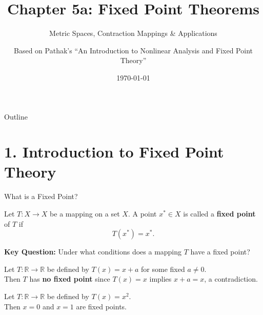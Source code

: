 \documentclass[aspectratio=169,10pt]{beamer}
\title[Chapter 5a: Fixed Point Theorems]{Chapter 5a: Fixed Point Theorems}
\subtitle{Metric Spaces, Contraction Mappings \& Applications}
\author{Based on Pathak's ``An Introduction to Nonlinear Analysis and Fixed Point Theory''}
\date{\today}
\institute{Nonlinear Analysis \& Fixed Point Theory}
\begin{document}
\begin{frame}
    \titlepage
\end{frame}

\begin{frame}{Outline}
    \tableofcontents
\end{frame}

\section{1. Introduction to Fixed Point Theory}

\begin{frame}{What is a Fixed Point?}
    \begin{definition}
        Let $T: X \to X$ be a mapping on a set $X$. A point $x^* \in X$ is called a \textbf{fixed point} of $T$ if
        \[
            T(x^*) = x^*.
        \]
    \end{definition}

    \vspace{0.5cm}
    \textbf{Key Question:} Under what conditions does a mapping $T$ have a fixed point?

    \vspace{0.5cm}
    \begin{example}
        Let $T: \mathbb{R} \to \mathbb{R}$ be defined by $T(x) = x + a$ for some fixed $a \neq 0$. \\
        Then $T$ has \textbf{no fixed point} since $T(x) = x$ implies $x + a = x$, a contradiction.
    \end{example}

    \vspace{0.3cm}
    \begin{example}
        Let $T: \mathbb{R} \to \mathbb{R}$ be defined by $T(x) = x^2$. \\
        Then $x = 0$ and $x = 1$ are fixed points.
    \end{example}
\end{frame}
\end{document}
